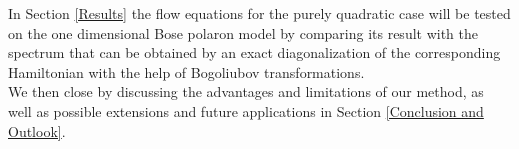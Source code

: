 In Section \ref{Results} the flow equations  for the purely quadratic case will be tested on the one dimensional Bose polaron model by comparing its result with the spectrum that can be obtained by an exact diagonalization of the corresponding Hamiltonian with the help of Bogoliubov transformations.\\
We then close by discussing the advantages and limitations of our method, as well as possible extensions and future applications in Section \ref{Conclusion and Outlook}.%
